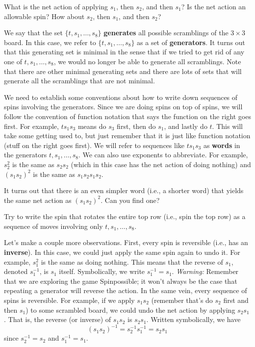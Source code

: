\begin{exercise}
What is the net action of applying $s_1$, then $s_2$, and then $s_1$?  Is the net action an allowable spin?  How about $s_2$, then $s_1$, and then $s_2$?
\end{exercise}

We say that the set $\{t, s_1,\ldots,s_8\}$ \textbf{generates} all possible scramblings of the $3\times 3$ board. In this case, we refer to $\{t, s_1,\ldots,s_8\}$ as a set of \textbf{generators}. It turns out that this generating set is minimal in the sense that if we tried to get rid of any one of $t, s_1, \ldots, s_8$, we would no longer be able to generate all scramblings.  Note that there are other minimal generating sets and there are lots of sets that will generate all the scramblings that are not minimal.

We need to establish some conventions about how to write down sequences of spins involving the generators.  Since we are doing spins on top of spins, we will follow the convention of function notation that says the function on the right goes first.  For example, $ts_1 s_3$ means do $s_3$ first, then do $s_1$, and lastly do $t$.  This will take some getting used to, but just remember that it is just like function notation (stuff on the right goes first).  We will refer to sequences like $ts_1 s_3$ as \textbf{words} in the generators $t,s_1,\ldots, s_8$. We can also use exponents to abbreviate.  For example, $s_2^2$ is the same as $s_2 s_2$ (which in this case has the net action of doing nothing) and $(s_1 s_2)^2$ is the same as $s_1 s_2 s_1 s_2$.

\begin{exercise}
It turns out that there is an even simpler word (i.e., a shorter word) that yields the same net action as $(s_1 s_2)^2$. Can you find one?
\end{exercise}

\begin{exercise}
Try to write the spin that rotates the entire top row (i.e., spin the top row) as a sequence of moves involving only $t, s_1, \ldots, s_8$.
\end{exercise}

Let's make a couple more observations.  First, every spin is reversible (i.e., has an \textbf{inverse}).  In this case, we could just apply the same spin again to undo it.  For example, $s_1^2$ is the same as doing nothing. This means that the reverse of $s_1$, denoted $s_1^{-1}$, is $s_1$ itself. Symbolically, we write $s_1^{-1}=s_1$.  \emph{Warning:} Remember that we are exploring the game Spinpossible; it won't always be the case that repeating a generator will reverse the action. In the same vein, every sequence of spins is reversible. For example, if we apply $s_1 s_2$ (remember that's do $s_2$ first and then $s_1$) to some scrambled board, we could undo the net action by applying $s_2 s_1$.  That is, the reverse (or inverse) of $s_1 s_2$ is $s_2 s_1$. Written symbolically, we have
\[
(s_1 s_2)^{-1}=s_2^{-1} s_1^{-1}=s_2 s_1
\]
since $s_2^{-1}=s_2$ and $s_1^{-1}=s_1$.


